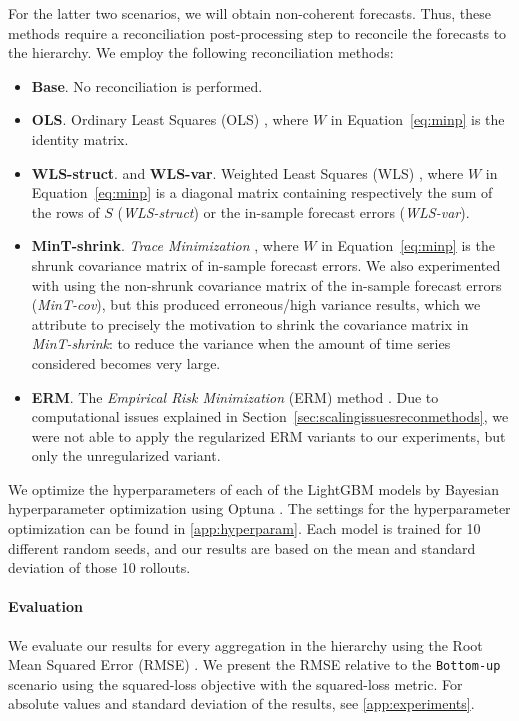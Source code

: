 \documentclass[preprint, 3p, times, twocolumn]{elsarticle}
\begin{document}
  For the latter two scenarios, we will obtain non-coherent forecasts. Thus, these methods require a reconciliation post-processing step to reconcile the forecasts to the hierarchy. We employ the following reconciliation methods:
  \begin{itemize}
    \item \textbf{Base}. No reconciliation is performed.
    \item \textbf{OLS}. Ordinary Least Squares (OLS) \cite{hyndman_optimal_2011}, where \(W\) in Equation~\eqref{eq:minp} is the identity matrix.
    \item \textbf{WLS-struct}. and \textbf{WLS-var}. Weighted Least Squares (WLS) \cite{wickramasuriya_optimal_2019}, where \(W\) in Equation~\eqref{eq:minp} is a diagonal matrix containing respectively the sum of the rows of \(S\) (\textit{WLS-struct}) or the in-sample forecast errors (\textit{WLS-var}).
    \item \textbf{MinT-shrink}. \textit{Trace Minimization} \cite{wickramasuriya_optimal_2019}, where \(W\) in Equation~\eqref{eq:minp} is the shrunk covariance matrix of in-sample forecast errors. We also experimented with using the non-shrunk covariance matrix of the in-sample forecast errors (\textit{MinT-cov}), but this produced erroneous/high variance results, which we attribute to precisely the motivation to shrink the covariance matrix in \textit{MinT-shrink}: to reduce the variance when the amount of time series considered becomes very large.
    \item \textbf{ERM}. The \textit{Empirical Risk Minimization} (ERM) method \cite{bentaieb_regularized_2019}. Due to computational issues explained in Section~\ref{sec:scalingissuesreconmethods}, we were not able to apply the regularized ERM variants to our experiments, but only the unregularized variant.
  \end{itemize}
  
  We optimize the hyperparameters of each of the LightGBM models by Bayesian hyperparameter optimization using Optuna \cite{akiba_optuna_2019}. The settings for the hyperparameter optimization can be found in \ref{app:hyperparam}. Each model is trained for 10 different random seeds, and our results are based on the mean and standard deviation of those 10 rollouts.

  \paragraph{Evaluation} We evaluate our results for every aggregation in the hierarchy using the Root Mean Squared Error (RMSE) \cite{hyndman_forecasting_2021}. We present the RMSE relative to the \texttt{Bottom-up} scenario using the squared-loss objective with the squared-loss metric. For absolute values and standard deviation of the results, see \ref{app:experiments}.
\end{document}
